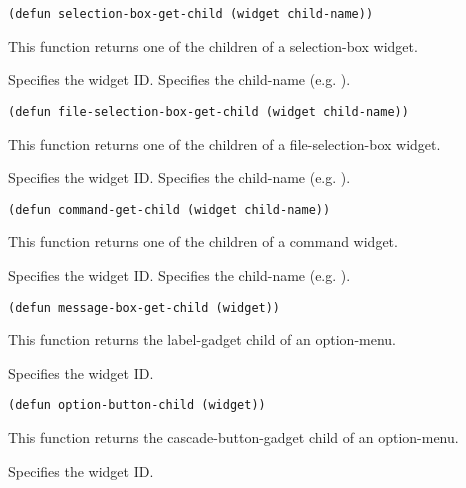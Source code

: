 \begin{lispd}
\syntax\begin{verbatim}
(defun selection-box-get-child (widget child-name))
\end{verbatim}
\beschr This function returns one of the children of a selection-box widget.
\parameter
\begin{paramd}
  Specifies the widget ID.
 Specifies the child-name (e.g. ).
\end{paramd}
\end{lispd}

\begin{lispd}
\syntax\begin{verbatim}
(defun file-selection-box-get-child (widget child-name))
\end{verbatim}
\beschr This function returns one of the children of a file-selection-box
widget.
\parameter
\begin{paramd}
  Specifies the widget ID.
 Specifies the child-name (e.g. ).
\end{paramd}
\end{lispd}

\begin{lispd}
\syntax\begin{verbatim}
(defun command-get-child (widget child-name))
\end{verbatim}
\beschr This function returns one of the children of a command widget.
\parameter
\begin{paramd}
  Specifies the widget ID.
 Specifies the child-name (e.g. ).
\end{paramd}
\end{lispd}

\begin{lispd}
\syntax\begin{verbatim}
(defun message-box-get-child (widget))
\end{verbatim}
\beschr This function returns the label-gadget child of an option-menu.
\parameter
\begin{paramd}
  Specifies the widget ID.
\end{paramd}
\end{lispd}

\begin{lispd}
\syntax\begin{verbatim}
(defun option-button-child (widget))
\end{verbatim}
\beschr This function returns the cascade-button-gadget child of an option-menu.
\parameter
\begin{paramd}
  Specifies the widget ID.
\end{paramd}
\end{lispd}

